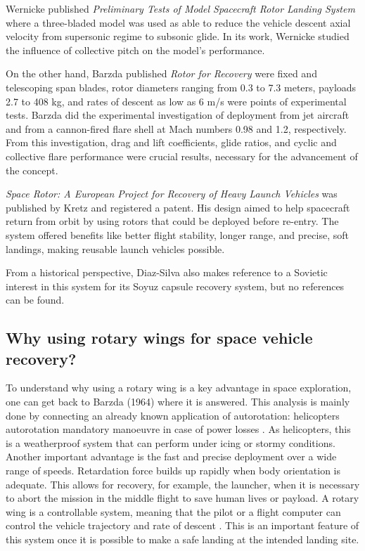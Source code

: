Wernicke published \textit{Preliminary Tests of Model Spacecraft Rotor Landing System} where a three-bladed model was used as able to reduce the vehicle descent axial velocity from supersonic regime to subsonic glide. In its work, Wernicke studied the influence of collective pitch on the model's performance.

On the other hand, Barzda published \textit{Rotor for Recovery} were fixed and telescoping span blades, rotor diameters ranging from 0.3 to 7.3 meters, payloads 2.7 to 408 kg, and rates of descent as low as 6 m/s were points of experimental tests. Barzda did the experimental investigation of deployment from jet aircraft and from a cannon-fired flare shell at  Mach numbers 0.98 and 1.2, respectively. From this investigation, drag and lift coefficients, glide ratios, and cyclic and collective flare performance were crucial results, necessary for the advancement of the concept.

\textit{Space Rotor: A European Project for Recovery of Heavy Launch Vehicles} was published by Kretz and registered a patent. His design aimed to help spacecraft return from orbit by using rotors that could be deployed before re-entry. The system offered benefits like better flight stability, longer range, and precise, soft landings, making reusable launch vehicles possible.

From a historical perspective, Diaz-Silva \cite{diaz-silva_rotary_2013} also makes reference to a Sovietic interest in this system for its Soyuz capsule recovery system, but no references can be found.


\subsection{Why using rotary wings for space vehicle recovery?}

To understand why using a rotary wing is a key advantage in space exploration, one can get back to Barzda (1964) \cite{barzda_rotors_1964} where it is answered. This analysis is mainly done by connecting an already known application of autorotation: helicopters autorotation mandatory manoeuvre in case of power losses \cite{federal_aviation_administration_helicopter_2021}. As helicopters, this is a weatherproof system that can perform under icing or stormy conditions. Another important advantage is the fast and precise deployment over a wide range of speeds. Retardation force builds up rapidly when body orientation is adequate. This allows for recovery, for example, the launcher, when it is necessary to abort the mission in the middle flight to save human lives or payload. A rotary wing is a controllable system, meaning that the pilot or a flight computer can control the vehicle trajectory and rate of descent \cite{federal_aviation_administration_helicopter_2021}. This is an important feature of this system once it is possible to make a safe landing at the intended landing site.

